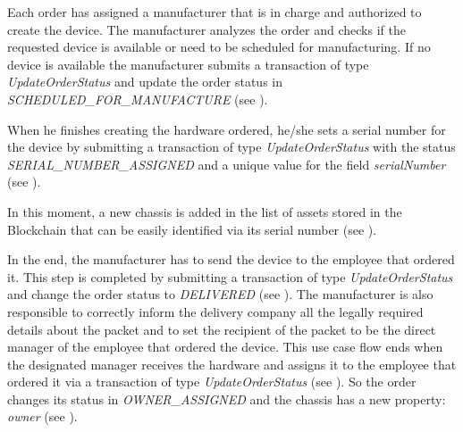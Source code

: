 
Each order has assigned a manufacturer that is in charge and authorized to create the device.
The manufacturer analyzes the order and checks if the requested device is available or need to be scheduled for manufacturing. If no device is available the manufacturer submits a transaction of type \emph{UpdateOrderStatus} and update the order status in \emph{SCHEDULED_FOR_MANUFACTURE} (see ). 


When he finishes creating the hardware ordered, he/she sets a serial number for the device by submitting a transaction of type \emph{UpdateOrderStatus} with the status \emph{SERIAL_NUMBER_ASSIGNED} and a unique value for the field \emph{serialNumber} (see ).


In this moment, a new chassis is added in the list of assets stored in the Blockchain that can be easily identified via its serial number (see ).


In the end, the manufacturer has to send the device to the employee that ordered it. This step is completed by submitting a transaction of type \emph{UpdateOrderStatus} and change the order status to \emph{DELIVERED} (see ). The manufacturer is also responsible to correctly inform the delivery company all the legally required details about the packet and to set the recipient of the packet to be the direct manager of the employee that ordered the device. 
This use case flow ends when the designated manager receives the hardware and assigns it to the employee that ordered it via a transaction of type \emph{UpdateOrderStatus} (see ). So the order changes its status in \emph{OWNER_ASSIGNED} and the chassis has a new property: \emph{owner} (see ).

